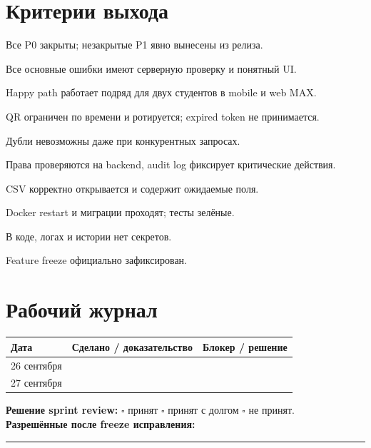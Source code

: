 \documentclass[11pt,a4paper]{article}
\begin{document}
\section{Критерии выхода}
\begin{tasklist}
  \item Все P0 закрыты; незакрытые P1 явно вынесены из релиза.
  \item Все основные ошибки имеют серверную проверку и понятный UI.
  \item Happy path работает подряд для двух студентов в mobile и web MAX.
  \item QR ограничен по времени и ротируется; expired token не принимается.
  \item Дубли невозможны даже при конкурентных запросах.
  \item Права проверяются на backend, audit log фиксирует критические действия.
  \item CSV корректно открывается и содержит ожидаемые поля.
  \item Docker restart и миграции проходят; тесты зелёные.
  \item В коде, логах и истории нет секретов.
  \item Feature freeze официально зафиксирован.
\end{tasklist}

\section{Рабочий журнал}
\begin{tabularx}{\textwidth}{p{25mm}X X}\toprule Дата & Сделано / доказательство & Блокер / решение\\\midrule
26 сентября & \rule{0pt}{11mm} & \\
27 сентября & \rule{0pt}{11mm} & \\\bottomrule\end{tabularx}
\vspace{4mm}\begin{goalbox}\textbf{Решение sprint review:} $\square$ принят \quad $\square$ принят с долгом \quad $\square$ не принят.\\[2mm]\textbf{Разрешённые после freeze исправления:} \rule{72mm}{0.4pt}\end{goalbox}
\end{document}

